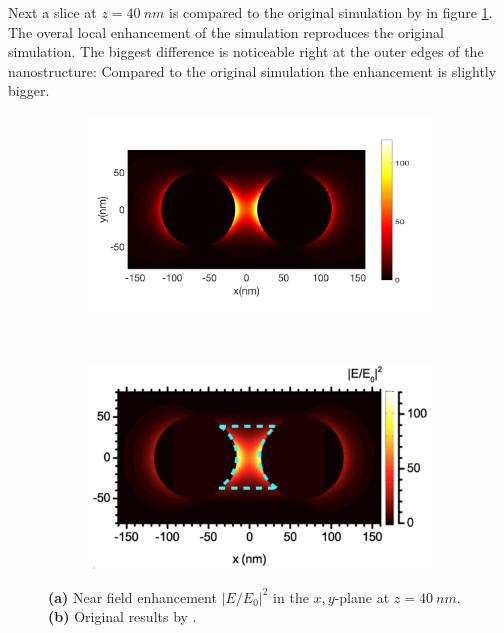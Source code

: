 Next a slice at $z=\SI{40}{nm}$ is compared to the original simulation by \cite{heeg} in figure \ref{fig:slice-comparision}. The overal local enhancement of the simulation reproduces the original simulation. The biggest difference is noticeable right at the outer edges of the nanostructure: Compared to the original simulation the enhancement is slightly bigger.

\begin{figure}[!h]
  \centering
  \begin{subfigure}{0.50\textwidth}
    \includegraphics[width=\textwidth]{./images/40nm.png}
  \end{subfigure}
  ~
  \begin{subfigure}{0.40\textwidth}
    \includegraphics[width=\textwidth]{./images/local-enhancement-heeg.png}
  \end{subfigure}
  \caption{\textbf{(a)} Near field enhancement $|E/E_0|^2$ in the $x,y$-plane at $z=\SI{40}{nm}$. \textbf{(b)} Original results by \cite{heeg}.}
  \label{fig:slice-comparision}
\end{figure}

